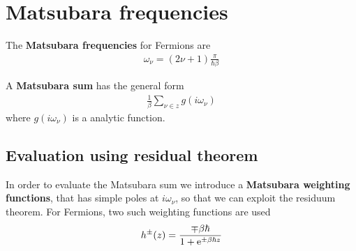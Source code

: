 \documentclass[11pt,a4paper]{report}
\begin{document}

\appendix
\chapter{Matsubara frequencies}
\label{app:matsubarafreq}

The \textbf{Matsubara frequencies} for Fermions are
\begin{eqnarray*}
\omega_\nu=(2\nu+1)\frac{\pi}{\hbar\beta}
\end{eqnarray*}

A \textbf{Matsubara sum}
 has the general form
\begin{eqnarray*}
\frac{1}{\beta}\sum_{\nu\in z} g(i\omega_\nu)
\end{eqnarray*}
where $g(i\omega_\nu)$ is a analytic function.

\section{Evaluation using residual theorem}
In order to evaluate the Matsubara sum we introduce a
\textbf{Matsubara weighting functions}, that has simple poles at $i\omega_\nu$, so that we can
exploit the residuum theorem. For Fermions, two such weighting
functions are used
\begin{eqnarray}
h^\pm(z)=\frac{\mp\beta\hbar}{1+\mathrm{e}^{\pm\beta\hbar z}}
\end{eqnarray}
\end{document}
